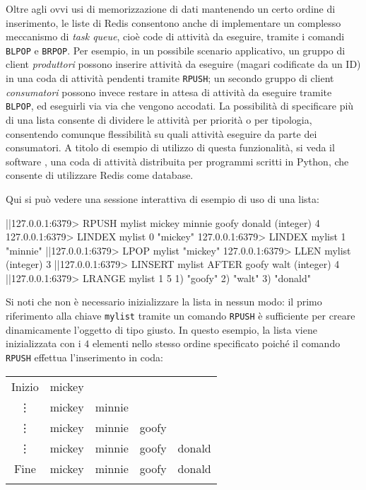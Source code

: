 Oltre agli ovvi usi di memorizzazione di dati mantenendo un certo ordine di inserimento, le liste di
Redis consentono anche di implementare un complesso meccanismo di \emph{task queue}, cioè code di
attività da eseguire, tramite i comandi \verb|BLPOP| e \verb|BRPOP|. Per esempio, in un possibile
scenario applicativo, un gruppo di client \emph{produttori} possono inserire attività da eseguire
(magari codificate da un ID) in una coda di attività pendenti tramite \verb|RPUSH|; un secondo
gruppo di client \emph{consumatori} possono invece restare in attesa di attività da eseguire
tramite \verb|BLPOP|, ed eseguirli via via che vengono accodati. La possibilità di specificare più
di una lista consente di dividere le attività per priorità o per tipologia, consentendo comunque
flessibilità su quali attività eseguire da parte dei consumatori. A titolo di esempio di utilizzo di
questa funzionalità, si veda il software
, una coda di attività distribuita per
programmi scritti in Python, che consente di utilizzare Redis come database.

Qui si può vedere una sessione interattiva di esempio di uso di una lista:

\begin{commentedsource}[style=redis]
|\lnote|127.0.0.1:6379> RPUSH mylist mickey minnie goofy donald
(integer) 4
127.0.0.1:6379> LINDEX mylist 0
"mickey"
127.0.0.1:6379> LINDEX mylist 1
"minnie"
|\lnote|127.0.0.1:6379> LPOP mylist
"mickey"
127.0.0.1:6379> LLEN mylist
(integer) 3
|\lnote|127.0.0.1:6379> LINSERT mylist AFTER goofy walt
(integer) 4
|\lnote|127.0.0.1:6379> LRANGE mylist 1 5
1) "goofy"
2) "walt"
3) "donald"
\end{commentedsource}

Si noti che non è necessario inizializzare la lista in nessun modo: il primo riferimento alla chiave
\verb|mylist| tramite un comando \verb|RPUSH|  è sufficiente per creare dinamicamente
l'oggetto di tipo giusto. In questo esempio, la lista viene inizializzata con i $4$ elementi nello
stesso ordine specificato poiché il comando \verb|RPUSH| effettua l'inserimento in coda:

\begin{center}
	\begin{tabular}{c|*{4}{c|}}
	  \hhline{~-}
	  \scriptsize Inizio & \cellcolor{blue!25}mickey \\ 
	  \hhline{~--}
	  \vdots             & mickey & \cellcolor{blue!25}minnie \\ 
	  \hhline{~---}
	  \vdots             & mickey & minnie & \cellcolor{blue!25}goofy \\ 
	  \hhline{~----}
	  \vdots             & mickey & minnie & goofy & \cellcolor{blue!25}donald \\ 
	  \hhline{~----}
	  \scriptsize Fine   & mickey & minnie & goofy & donald \\ 
	  \hhline{~----}
	\end{tabular}
\end{center}


